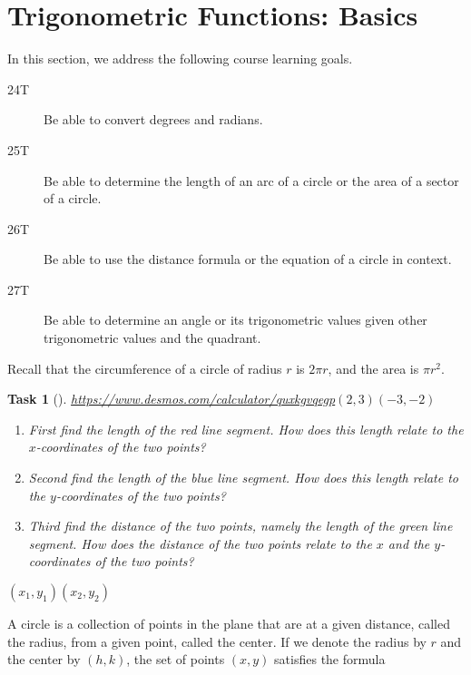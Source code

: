 \documentclass[10pt,]{article}
\theoremstyle{plain}
\newtheorem{proposition}[theorem]{Task}
\theoremstyle{definition}
\numberwithin{equation}{section}
\begin{document}
\section[{Trigonometric Functions: Basics}]{Trigonometric Functions: Basics}\label{section-trig}
\hypertarget{p-108}{}%
In this section, we address the following course learning goals.%
\leavevmode%
\begin{description}
\item[{24T}]\hypertarget{li-238}{}\hypertarget{p-109}{}%
Be able to convert degrees and radians.%
\item[{25T}]\hypertarget{li-239}{}\hypertarget{p-110}{}%
Be able to determine the length of an arc of a circle or the area of a sector of a circle.%
\item[{26T}]\hypertarget{li-240}{}\hypertarget{p-111}{}%
Be able to use the distance formula or the equation of a circle in context.%
\item[{27T}]\hypertarget{li-241}{}\hypertarget{p-112}{}%
Be able to determine an angle or its trigonometric values given other trigonometric values and the quadrant.%
\end{description}
\hypertarget{p-113}{}%
Recall that the circumference of a circle of radius \(r\) is \(2\pi r\), and the area is \(\pi r^2\).%
\begin{proposition}[{}]\label{proposition-46}
\href{https://www.desmos.com/calculator/quxkgvqegp}{https://www.desmos.com/calculator/quxkgvqegp}\((2,3)\)\((-3,-2)\)\leavevmode%
\begin{enumerate}
\item\hypertarget{li-242}{}First find the length of the red line segment. How does this length relate to the \(x\)-coordinates of the two points?%
\item\hypertarget{li-243}{}Second find the length of the blue line segment. How does this length relate to the \(y\)-coordinates of the two points?%
\item\hypertarget{li-244}{}Third find the distance of the two points, namely the length of the green line segment. How does the distance of the two points relate to the \(x\) and the \(y\)-coordinates of the two points?%
\end{enumerate}
\((x_1,y_1)\)\((x_2,y_2)\)\end{proposition}
\hypertarget{p-114}{}%
A circle is a collection of points in the plane that are at a given distance, called the radius, from a given point, called the center. If we denote the radius by \(r\) and the center by \((h,k)\), the set of points \((x,y)\) satisfies the formula%
\end{document}
